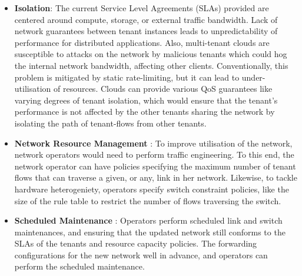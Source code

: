 \begin{itemize}
	\item \textbf{Isolation}: The current Service Level Agreements
          (SLAs) provided are centered around compute, storage, or
          external traffic bandwidth. Lack of network guarantees
          between tenant instances leads to unpredictability of
          performance for distributed applications. Also, multi-tenant
          clouds are susceptible to attacks on the network by
          malicious tenants which could hog the internal network
          bandwidth, affecting other clients. Conventionally, this
          problem is mitigated by static rate-limiting, but it can
          lead to under-utilisation of resources. Clouds can provide
          various QoS guarantees like varying degrees of tenant
          isolation, which would ensure that the tenant's performance
          is not affected by the other tenants sharing the network by
          isolating the path of tenant-flows from other tenants.
	\item \textbf{Network Resource Management} : To improve
          utilisation of the network, network operators would need to
          perform traffic engineering. To this end, the network
          operator can have policies specifying the maximum number of
          tenant flows that can traverse a given, or any, link in her
          network.
          Likewise, to tackle hardware heterogeniety, operators
          specify switch constraint policies, like the size of the
          rule table to restrict the number of flows traversing the
          switch.
	\item \textbf{Scheduled Maintenance} : Operators perform
          scheduled link and switch maintenances, and ensuring that
          the updated network still conforms to the SLAs of the
          tenants and resource capacity policies.  The forwarding
          configurations for the new network well in advance, and
          operators can perform the scheduled maintenance.
\end{itemize}

